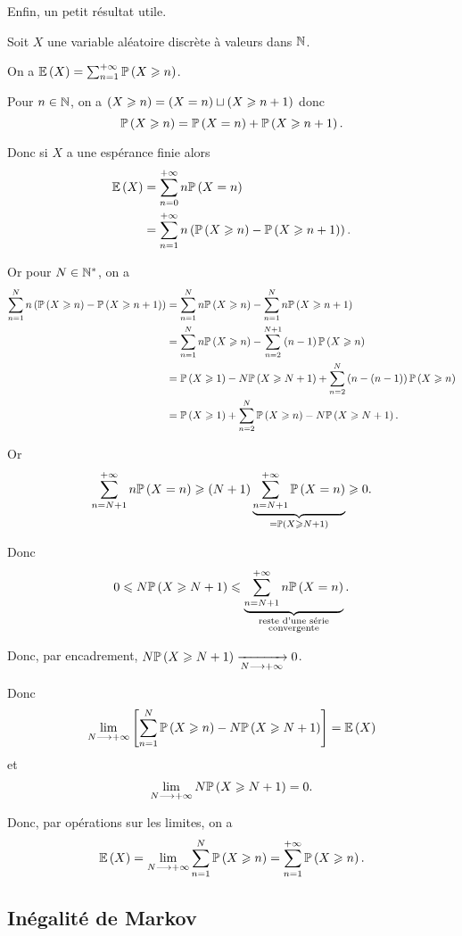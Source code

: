 Enfin, un petit résultat utile.

\begin{prop}
Soit \(X\) une variable aléatoire discrète à valeurs dans \(\N\).

On a \(\esp{X}=\sum_{n=1}^{\pinf}\proba{X\geq n}\).
\end{prop}

\begin{dem}
Pour \(n\in\N\), on a \(\paren{X\geq n}=\paren{X=n}\sqcup\paren{X\geq n+1}\) donc \[\proba{X\geq n}=\proba{X=n}+\proba{X\geq n+1}.\]

Donc si \(X\) a une espérance finie alors \[\begin{aligned}
\esp{X}&=\sum_{n=0}^{\pinf}n\proba{X=n} \\
&=\sum_{n=1}^{\pinf}n\paren{\proba{X\geq n}-\proba{X\geq n+1}}.
\end{aligned}\]

Or pour \(N\in\Ns\), on a \[\begin{aligned}
\sum_{n=1}^Nn\paren{\proba{X\geq n}-\proba{X\geq n+1}}&=\sum_{n=1}^Nn\proba{X\geq n}-\sum_{n=1}^Nn\proba{X\geq n+1} \\
&=\sum_{n=1}^Nn\proba{X\geq n}-\sum_{n=2}^{N+1}\paren{n-1}\proba{X\geq n} \\
&=\proba{X\geq1}-N\proba{X\geq N+1}+\sum_{n=2}^N\paren{n-\paren{n-1}}\proba{X\geq n} \\
&=\proba{X\geq1}+\sum_{n=2}^N\proba{X\geq n}-N\proba{X\geq N+1}.
\end{aligned}\]

Or \[\sum_{n=N+1}^{\pinf}n\proba{X=n}\geq\paren{N+1}\underbrace{\sum_{n=N+1}^{\pinf}\proba{X=n}}_{=\proba{X\geq N+1}}\geq0.\]

Donc \[0\leq N\proba{X\geq N+1}\leq\underbrace{\sum_{n=N+1}^{\pinf}n\proba{X=n}}_{\substack{\text{reste d'une série} \\ \text{convergente}}}.\]

Donc, par encadrement, \(N\proba{X\geq N+1}\tendqd{N\to\pinf}0\).

Donc \[\lim_{N\to\pinf}\croch{\sum_{n=1}^N\proba{X\geq n}-N\proba{X\geq N+1}}=\esp{X}\] et \[\lim_{N\to\pinf}N\proba{X\geq N+1}=0.\]

Donc, par opérations sur les limites, on a \[\esp{X}=\lim_{N\to\pinf}\sum_{n=1}^N\proba{X\geq n}=\sum_{n=1}^{\pinf}\proba{X\geq n}.\]
\end{dem}

\subsection{Inégalité de Markov}

